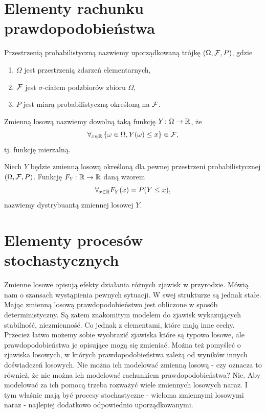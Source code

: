\documentclass[10pt,a4paper]{book}
\begin{document}
\section{Elementy rachunku prawdopodobieństwa} 
 
\begin{definition}
Przestrzenią probabilistyczną nazwiemy uporządkowaną trójkę $ {\left( {\Omega, \mathcal{F}, P} \right)} $, gdzie
\begin{enumerate}
\item $\Omega$  jest przestrzenią zdarzeń elementarnych,
\item $\mathcal{F}$ jest $\sigma$-ciałem podzbiorów zbioru $\Omega$,
\item $P$ jest miarą probabilistyczną określoną na $\mathcal{F}$.
\end{enumerate}
\end{definition}

\begin{definition}
Zmienną losową nazwiemy dowolną taką funkcję $Y \colon \Omega \to \mathbb{R}$, że
$$
\forall_{x \in \mathbb{R} } \left\lbrace { \omega \in \Omega, Y(\omega) \leq x} \right\rbrace \in \mathcal{F},
$$
tj. funkcję mierzalną.
\end{definition}

\begin{definition}[Dystrybuanta]
Niech $Y$ będzie zmienną losową określoną dla pewnej przestrzeni probabilistycznej ${\left( {\Omega,\mathcal{F},P} \right)}$. Funkcję $F_Y \colon \mathbb{R} \to \mathbb{R}$ daną wzorem
$$
\forall_{x \in \mathbb{R} } F_Y(x) = P(Y \leq x),
$$
nazwiemy dystrybuantą zmiennej losowej $Y$.
\end{definition}

\section{Elementy procesów stochastycznych}

Zmienne losowe opisują efekty działania różnych zjawisk w przyrodzie. Mówią nam o szansach wystąpienia pewnych sytuacji. W swej strukturze są jednak stałe. Mając zmienną losową prawdopodobieństwo jest obliczone w sposób deterministyczny. Są zatem znakomitym modelem do zjawisk wykazujących stabilność, niezmienność. Co jednak z elementami, które mają inne cechy. Przecież łatwo możemy sobie wyobrazić zjawiska które są typowo losowe, ale prawdopodobieństwa je opisujące mogą się zmieniać. Można też pomyśleć o zjawiska losowych, w których prawdopodobieństwa zależą od wyników innych doświadczeń losowych. Nie można ich modelować zmienną losową - czy oznacza to również, że nie można ich modelować rachunkiem prawdopodobieństwa? Nie. Aby modelować za ich pomocą trzeba rozważyć wiele zmiennych losowych naraz. I tym właśnie mają być procesy stochastyczne - wieloma zmiennymi losowymi naraz - najlepiej dodatkowo odpowiednio uporządkowanymi.
\end{document}
